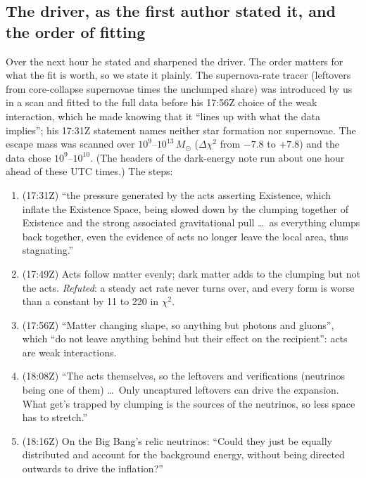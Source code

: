 \documentclass[11pt,a4paper]{article}
\begin{document}
\subsection{The driver, as the first author stated it, and the order of fitting}
Over the next hour he stated and sharpened the driver. The order matters for what the fit is worth, so we state it plainly. The
supernova-rate tracer (leftovers from core-collapse supernovae times the unclumped share) was introduced by us in a scan and fitted to the
full data before his 17:56Z choice of the weak interaction, which he made knowing that it ``lines up with what the data implies''; his
17:31Z statement names neither star formation nor supernovae. The escape mass was scanned over $10^9$--$10^{13}\,M_\odot$ ($\Delta\chi^2$
from $-7.8$ to $+7.8$) and the data chose $10^9$--$10^{10}$. (The headers of the dark-energy note run about one hour ahead of these UTC
times.) The steps:
\begin{enumerate}[leftmargin=*,itemsep=2pt]
\item (17:31Z) ``the pressure generated by the acts asserting Existence, which inflate the Existence Space, being slowed down by the clumping
together of Existence and the strong associated gravitational pull \dots\ as everything clumps back together, even the evidence of acts no
longer leave the local area, thus stagnating.''
\item (17:49Z) Acts follow matter evenly; dark matter adds to the clumping but not the acts. \emph{Refuted}: a steady act rate never turns over,
and every form is worse than a constant by 11 to 220 in $\chi^2$.
\item (17:56Z) ``Matter changing shape, so anything but photons and gluons'', which ``do not leave anything behind but their effect on the
recipient'': acts are weak interactions.
\item (18:08Z) ``The acts themselves, so the leftovers and verifications (neutrinos being one of them) \dots\ Only uncaptured leftovers can
drive the expansion. What get's trapped by clumping is the sources of the neutrinos, so less space has to stretch.''
\item (18:16Z) On the Big Bang's relic neutrinos: ``Could they just be equally distributed and account for the background energy, without being
directed outwards to drive the inflation?''
\end{enumerate}
\end{document}
